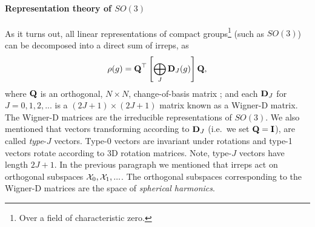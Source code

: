 \paragraph{Representation theory of $SO(3)$}
As it turns out, all linear representations of compact groups\footnote{Over a field of characteristic zero.} (such as $SO(3)$) can be decomposed into a direct sum of irreps, as
\begin{align}
    \rho(g) = \textbf{Q}^{\top} \left [ \bigoplus_{J} \textbf{D}_{J}(g) \right ] \textbf{Q}, \label{eq:compact-decomposition}
\end{align}
where $\textbf{Q}$ is an orthogonal, $N \times N$, change-of-basis matrix \citep{chirikjian2001engineering}; and each $\textbf{D}_J$ for $J = 0,1,2,...$ is a $(2J+1) \times (2J + 1)$ matrix known as a Wigner-D matrix. The Wigner-D matrices are the irreducible representations of $SO(3)$. We also mentioned that vectors transforming according to $\textbf{D}_J$ (i.e.\ we set $\textbf{Q} = \textbf{I}$), are called \emph{type}-$J$ vectors. Type-0 vectors are invariant under rotations and type-1 vectors rotate according to 3D rotation matrices. Note, type-$J$ vectors have length $2J+1$. In the previous paragraph we mentioned that irreps act on orthogonal subspaces $\mathcal{X}_0, \mathcal{X}_1, ...$. The orthogonal subspaces corresponding to the Wigner-D matrices are the space of \emph{spherical harmonics}.

